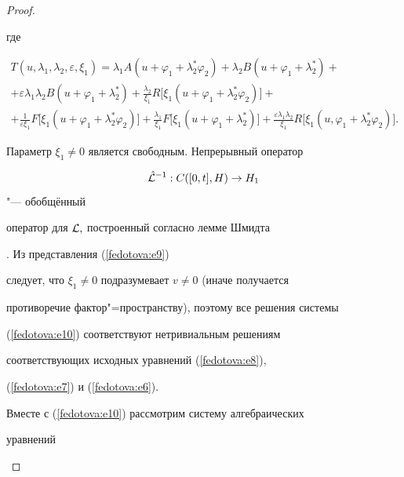\begin{proof}
\begin{equation}
\end{equation}

где

\begin{multline*}

T(u,\lambda_1,\lambda_2,\varepsilon,\xi_1)=\lambda_1A(u+\varphi_1+\lambda_2^*\varphi_2)+

\lambda_2B(u+\varphi_1+\lambda_2^*)+

\\ 

+\varepsilon\lambda_1\lambda_2B(u+\varphi_1+\lambda_2^*)+

\displaystyle\frac{\lambda_2}{\xi_1}R\bigl[\xi_1(u+\varphi_1+\lambda_2^*\varphi_2)\bigr]+

\\

+\displaystyle\frac{1}{\varepsilon\xi_1}F\bigl[\xi_1(u+\varphi_1+\lambda_2^*\varphi_2)\bigr]+

\displaystyle\frac{\lambda_1}{\xi_1}F\bigl[\xi_1(u+\varphi_1+\lambda_2^*)\bigr]+

\displaystyle\frac{\varepsilon\lambda_1\lambda_2}{\xi_1}R\bigl[\xi_1(u,\varphi_1+\lambda_2^*\varphi_2)\bigr].

\end{multline*}

Параметр $\xi_1\neq0$ является свободным. Непрерывный оператор

$$\hat{{\cal L}}^{-1}:  C([0, t], H)\rightarrow H_1$$  "---  обобщённый

оператор для ${\cal L},$ построенный согласно лемме Шмидта

\cite{fedotova:tren}. Из представления (\ref{fedotova:e9})

следует, что $\xi_1\neq0$ подразумевает $v\neq0$ (иначе получается

противоречие фактор"=пространству), поэтому все решения системы

(\ref{fedotova:e10}) соответствуют нетривиальным решениям

соответствующих исходных уравнений (\ref{fedotova:e8}),

(\ref{fedotova:e7}) и (\ref{fedotova:e6}).



Вместе с (\ref{fedotova:e10}) рассмотрим систему алгебраических

уравнений

\begin{equation}

\label{fedotova:e11}


\end{equation}
\end{proof}
